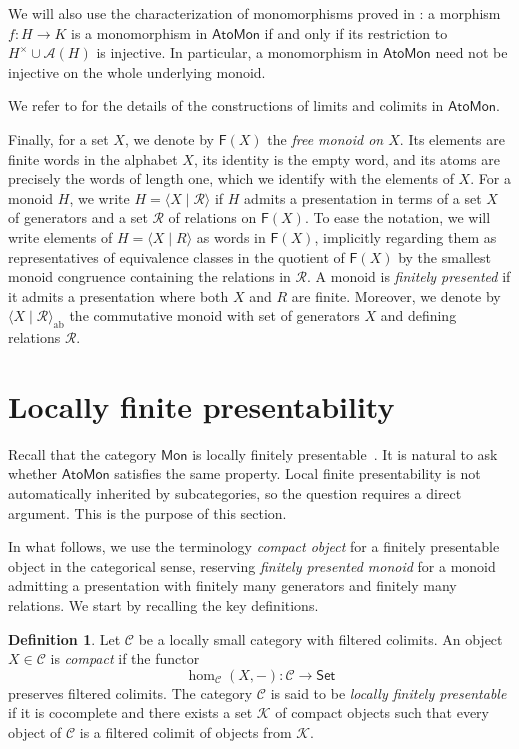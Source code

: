 \documentclass[a4paper,10pt,reqno]{amsart}
\theoremstyle{definition}
\newtheorem{definition}[theorem]{Definition}
\theoremstyle{remark}
\newcommand{\AtoMon}{\mathsf{AtoMon}}
\newcommand{\Mon}{\mathsf{Mon}}
\newcommand{\Set}{\mathsf{Set}}
\newcommand{\A}{\mathscr A}
\newcommand{\F}{\mathsf F}
\newcommand{\Hom}{\operatorname{hom}}
\newcommand{\Cal}[1]{\mathcal{#1}}
\begin{document}
We will also use the characterization of monomorphisms proved in
\cite[Remark~3.1(iv)]{CCT}: a morphism $f\colon H\to K$ is a monomorphism in $\AtoMon$ if and only if its restriction to $H^\times\cup\A(H)$ is injective. In particular, a monomorphism in $\AtoMon$ need not be injective on the whole underlying monoid.

We refer to \cite[Sections~4-6]{CCT} for the details of the constructions of limits and colimits in $\AtoMon$.

\medskip

Finally, for a set $X$, we denote by $\F(X)$ the {\em free monoid on $X$}. Its elements are finite words in the alphabet $X$, its identity is the empty word, and its atoms are precisely the words of length one, which we identify with the elements of $X$. For a monoid $H$, we write $H=\langle X\mid \Cal R\rangle$ if $H$ admits a presentation in terms of a set $X$ of generators and a set $\Cal R$ of relations on $\F(X)$. To ease the notation, we will write elements of $H=\langle X\mid R\rangle$ as words in $\F(X)$, implicitly regarding them as representatives of equivalence classes in the quotient of $\F(X)$ by the smallest monoid congruence containing the relations in $\Cal R$.
A monoid is \emph{finitely presented} if it admits a presentation where both $X$ and $R$ are finite. Moreover, we denote by $\langle X\mid\mathcal R\rangle_{\mathrm{ab}}$ the commutative monoid with set of generators $X$ and defining
relations $\mathcal R$.



\section{Locally finite presentability}\label{sec:lfp}
Recall that the category $\Mon$ is locally finitely presentable~\cite[Example~1.2(5)]{AR}. It is natural to ask whether $\AtoMon$ satisfies the same property. Local finite presentability is not automatically inherited by subcategories, so the question requires a direct argument. This is the purpose of this section.

In what follows, we use the terminology \emph{compact object} for a finitely presentable
object in the categorical sense, reserving \emph{finitely presented
monoid} for a monoid admitting a presentation with finitely many
generators and finitely many relations. We start by recalling the key definitions.

\begin{definition}\cite[Chapter~1]{AR}\label{def:locfinpres}
Let $\mathcal C$ be a locally small category with filtered colimits.  An
object $X\in\mathcal C$ is \emph{compact} if the functor
$$
  \Hom_{\mathcal C}(X,-):\mathcal C\to\Set
$$
preserves filtered colimits. The category $\mathcal{C}$ is said to be {\em locally finitely presentable} if it is cocomplete and there exists a set $\mathcal{K}$ of compact objects such that every object of $\mathcal{C}$ is a filtered colimit of objects from $\mathcal{K}$.
\end{definition}
\end{document}
